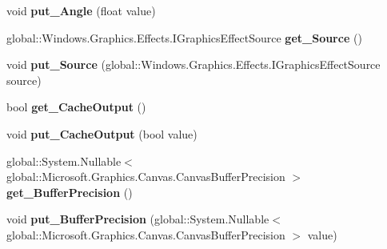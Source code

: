 \begin{DoxyCompactItemize}
\item 
\mbox{\label{class_microsoft_1_1_graphics_1_1_canvas_1_1_effects_1_1_emboss_effect_ad7260653a41639ec65d5c966c05ba7a2}} 
void {\bfseries put\+\_\+\+Angle} (float value)
\item 
\mbox{\label{class_microsoft_1_1_graphics_1_1_canvas_1_1_effects_1_1_emboss_effect_a36340e7d6e5ac47dd89f4f7d37c07345}} 
global\+::\+Windows.\+Graphics.\+Effects.\+I\+Graphics\+Effect\+Source {\bfseries get\+\_\+\+Source} ()
\item 
\mbox{\label{class_microsoft_1_1_graphics_1_1_canvas_1_1_effects_1_1_emboss_effect_a314ec78bf6cdaad6673cf374c267cdf0}} 
void {\bfseries put\+\_\+\+Source} (global\+::\+Windows.\+Graphics.\+Effects.\+I\+Graphics\+Effect\+Source source)
\item 
\mbox{\label{class_microsoft_1_1_graphics_1_1_canvas_1_1_effects_1_1_emboss_effect_a5d487e3805c8a718aa6ec80761806b9e}} 
bool {\bfseries get\+\_\+\+Cache\+Output} ()
\item 
\mbox{\label{class_microsoft_1_1_graphics_1_1_canvas_1_1_effects_1_1_emboss_effect_a95e103f8178fdc5b88c0773380e172bb}} 
void {\bfseries put\+\_\+\+Cache\+Output} (bool value)
\item 
\mbox{\label{class_microsoft_1_1_graphics_1_1_canvas_1_1_effects_1_1_emboss_effect_ab93ee8ef4edb03a851c1e92e305e56af}} 
global\+::\+System.\+Nullable$<$ global\+::\+Microsoft.\+Graphics.\+Canvas.\+Canvas\+Buffer\+Precision $>$ {\bfseries get\+\_\+\+Buffer\+Precision} ()
\item 
\mbox{\label{class_microsoft_1_1_graphics_1_1_canvas_1_1_effects_1_1_emboss_effect_a82a3320c61a308b9c1336fd1d381f86c}} 
void {\bfseries put\+\_\+\+Buffer\+Precision} (global\+::\+System.\+Nullable$<$ global\+::\+Microsoft.\+Graphics.\+Canvas.\+Canvas\+Buffer\+Precision $>$ value)

\end{DoxyCompactItemize}
